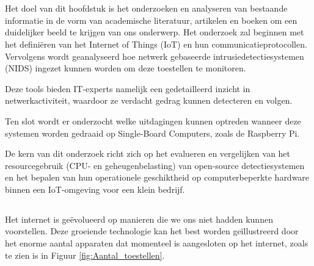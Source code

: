 \chapter{}%
\label{ch:stand-van-zaken}



\section{}

Het doel van dit hoofdstuk is het onderzoeken en analyseren van bestaande informatie in de vorm van academische literatuur, artikelen en boeken om een duidelijker beeld te krijgen van ons onderwerp. Het onderzoek zal beginnen met het definiëren van het Internet of Things (IoT) en hun communicatieprotocollen. Vervolgens wordt geanalyseerd hoe netwerk gebaseerde intrusiedetectiesystemen (NIDS) ingezet kunnen worden om deze toestellen te monitoren.
\vspace{1em}

Deze tools bieden IT-experts namelijk een gedetailleerd inzicht in netwerkactiviteit, waardoor ze verdacht gedrag kunnen detecteren en volgen.
\vspace{1em}

Ten slot wordt er onderzocht welke uitdagingen kunnen optreden wanneer deze systemen worden gedraaid op Single-Board Computers, zoals de Raspberry Pi.
\vspace{1em}

De kern van dit onderzoek richt zich op het evalueren en vergelijken van het resourcegebruik (CPU- en geheugenbelasting) van open-source detectiesystemen en het bepalen van hun operationele geschiktheid op computerbeperkte hardware binnen een IoT-omgeving voor een klein bedrijf.
\vspace{8em}


\section{}

Het internet is geëvolueerd op manieren die we ons niet hadden kunnen voorstellen. Deze groeiende technologie kan het best worden geïllustreerd door het enorme aantal apparaten dat momenteel is aangesloten op het internet, zoals te zien is in Figuur \ref{fig:Aantal_toestellen}.

